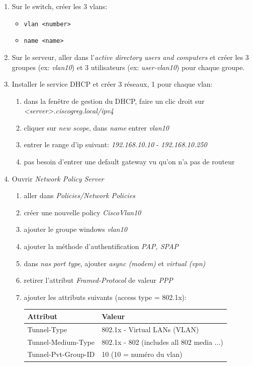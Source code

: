 \documentclass[a4paper]{article}
\begin{document}
\begin{enumerate}

\item Sur le switch, créer les 3 vlans:
\begin{itemize}
    \item \texttt{vlan <number>}
    \item \texttt{name <name>}
\end{itemize}

\item Sur le serveur, aller dans l'\textit{active directory users and computers} et créer les 3 groupes (ex: \textit{vlan10}) et 3 utilisateurs (ex: \textit{user-vlan10}) pour chaque groupe.

\item Installer le service DHCP et créer 3 réseaux, 1 pour chaque vlan:
\begin{enumerate}
    \item dans la fenêtre de gestion du DHCP, faire un clic droit sur \textit{<server>.ciscogreg.local/ipv4}
    \item cliquer sur \textit{new scope}, dans \textit{name} entrer \textit{vlan10}
    \item entrer le range d'ip suivant: \textit{192.168.10.10} - \textit{192.168.10.250}
    \item pas besoin d'entrer une default gateway vu qu'on n'a pas de routeur
\end{enumerate}

\item Ouvrir \textit{Network Policy Server}
\begin{enumerate}
    \item aller dans \textit{Policies/Network Policies}
    \item créer une nouvelle policy \textit{CiscoVlan10}
    \item ajouter le groupe windows \textit{vlan10}
    \item ajouter la méthode d'authentification \textit{PAP, SPAP}
    \item dans \textit{nas port type}, ajouter \textit{async (modem)} et \textit{virtual (vpn)}
    \item retirer l'attribut \textit{Framed-Protocol} de valeur \textit{PPP}
    \item ajouter les attributs suivants (access type = 802.1x):
    \begin{center} \begin{tabular}{ll} \hline
        \textbf{Attribut}   & \textbf{Valeur} \\ \hline
        Tunnel-Type         & 802.1x - Virtual LANs (VLAN) \\
        Tunnel-Medium-Type  & 802.1x - 802 (includes all 802 media ...) \\
        Tunnel-Pvt-Group-ID & 10 (10 = numéro du vlan)\\ \hline
    \end{tabular} \end{center}
\end{enumerate}


\end{enumerate}
\end{document}
